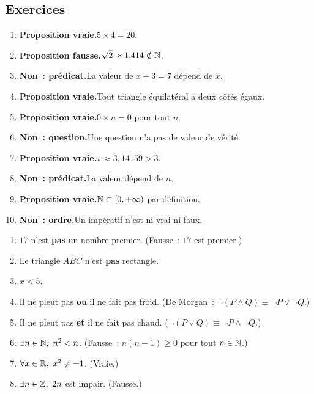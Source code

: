 

\subsection*{Exercices}


\begin{enumerate}
  \item \textbf{Proposition vraie.}\enspace $5\times4=20$.
  \item \textbf{Proposition fausse.}\enspace $\sqrt{2}\approx1{,}414\notin\mathbb{N}$.
  \item \textbf{Non~: pr\'edicat.}\enspace La valeur de $x+3=7$ d\'epend de $x$.
  \item \textbf{Proposition vraie.}\enspace Tout triangle \'equilat\'eral a deux c\^ot\'es \'egaux.
  \item \textbf{Proposition vraie.}\enspace $0\times n=0$ pour tout $n$.
  \item \textbf{Non~: question.}\enspace Une question n'a pas de valeur de v\'erit\'e.
  \item \textbf{Proposition vraie.}\enspace $\pi\approx3{,}14159>3$.
  \item \textbf{Non~: pr\'edicat.}\enspace La valeur d\'epend de $n$.
  \item \textbf{Proposition vraie.}\enspace $\mathbb{N}\subset[0,+\infty)$ par d\'efinition.
  \item \textbf{Non~: ordre.}\enspace Un imp\'eratif n'est ni vrai ni faux.
\end{enumerate}


\begin{enumerate}
  \item $17$ n'est \textbf{pas} un nombre premier. (Fausse~: $17$ est premier.)
  \item Le triangle $ABC$ n'est \textbf{pas} rectangle.
  \item $x < 5$.
  \item Il ne pleut pas \textbf{ou} il ne fait pas froid.
        (De Morgan~: $\lnot(P\land Q)\equiv\lnot P\lor\lnot Q$.)
  \item Il ne pleut pas \textbf{et} il ne fait pas chaud.
        ($\lnot(P\lor Q)\equiv\lnot P\land\lnot Q$.)
  \item $\exists n\in\mathbb{N},\ n^2<n$. (Fausse~: $n(n-1)\geq0$ pour tout $n\in\mathbb{N}$.)
  \item $\forall x\in\mathbb{R},\ x^2\ne-1$. (Vraie.)
  \item $\exists n\in\mathbb{Z},\ 2n$ est impair. (Fausse.)
\end{enumerate}

